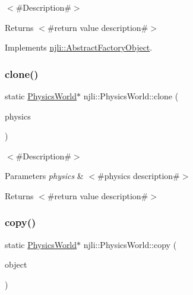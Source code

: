 $<$\#\+Description\#$>$

\begin{DoxyReturn}{Returns}
$<$\#return value description\#$>$ 
\end{DoxyReturn}


Implements \mbox{\hyperlink{classnjli_1_1_abstract_factory_object_a4763d05bc9dc37c559111f8bb30e1dd8}{njli\+::\+Abstract\+Factory\+Object}}.

\mbox{\label{classnjli_1_1_physics_world_a99e15fd93e236e959f2b7ce4a284279c}} 
\subsubsection{\texorpdfstring{clone()}{clone()}}
{\footnotesize\ttfamily static \mbox{\hyperlink{classnjli_1_1_physics_world}{Physics\+World}}$\ast$ njli\+::\+Physics\+World\+::clone (\begin{DoxyParamCaption}\item[{const \mbox{\hyperlink{classnjli_1_1_physics_world}{Physics\+World}} \&}]{physics }\end{DoxyParamCaption})\hspace{0.3cm}{\ttfamily [static]}}

$<$\#\+Description\#$>$


\begin{DoxyParams}{Parameters}
{\em physics} & $<$\#physics description\#$>$\\
\hline
\end{DoxyParams}
\begin{DoxyReturn}{Returns}
$<$\#return value description\#$>$ 
\end{DoxyReturn}
\mbox{\label{classnjli_1_1_physics_world_a03aca8773a10c85fd06e045542104e1c}} 
\subsubsection{\texorpdfstring{copy()}{copy()}}
{\footnotesize\ttfamily static \mbox{\hyperlink{classnjli_1_1_physics_world}{Physics\+World}}$\ast$ njli\+::\+Physics\+World\+::copy (\begin{DoxyParamCaption}\item[{const \mbox{\hyperlink{classnjli_1_1_physics_world}{Physics\+World}} \&}]{object }\end{DoxyParamCaption})\hspace{0.3cm}{\ttfamily [static]}}

